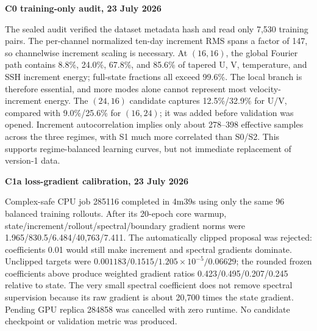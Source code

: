 \documentclass[11pt]{article}
\newenvironment{examplebox}[1]
  {\begin{center}\begin{lrbox}{\examplestore}\begin{minipage}{0.92\textwidth}%
   \textbf{#1}\par\smallskip}
  {\end{minipage}\end{lrbox}\setlength{\fboxsep}{8pt}%
   \fcolorbox{blue}{lightblue}{\usebox{\examplestore}}\end{center}}
\begin{document}
\begin{examplebox}{C0 training-only audit, 23 July 2026}
The sealed audit verified the dataset metadata hash and read only 7,530 training pairs.
The per-channel normalized ten-day increment RMS spans a factor of 147, so channelwise
increment scaling is necessary.  At \((16,16)\), the global Fourier path contains
8.8\%, 24.0\%, 67.8\%, and 85.6\% of tapered U, V, temperature, and SSH increment
energy; full-state fractions all exceed 99.6\%.  The local branch is therefore essential,
and more modes alone cannot represent most velocity-increment energy.  The
\((24,16)\) candidate captures 12.5\%/32.9\% for U/V, compared with
9.0\%/25.6\% for \((16,24)\); it was added before validation was opened.  Increment
autocorrelation implies only about 278--398 effective samples across the three regimes,
with S1 much more correlated than S0/S2.  This supports regime-balanced learning curves,
but not immediate replacement of version-1 data.
\end{examplebox}

\begin{examplebox}{C1a loss-gradient calibration, 23 July 2026}
Complex-safe CPU job 285116 completed in 4m39s using only the same 96 balanced training
rollouts.  After its 20-epoch core warmup, state/increment/rollout/spectral/boundary
gradient norms were 1.965/830.5/6.484/40,763/7.411.  The automatically clipped proposal
was rejected: coefficients 0.01 would still make increment and spectral gradients
dominate.  Unclipped targets were
\(0.001183/0.1515/1.205\times10^{-5}/0.06629\); the rounded frozen coefficients above
produce weighted gradient ratios 0.423/0.495/0.207/0.245 relative to state.  The very
small spectral coefficient does not remove spectral supervision because its raw
gradient is about 20,700 times the state gradient.  Pending GPU replica 284858 was
cancelled with zero runtime.  No candidate checkpoint or validation metric was produced.
\end{examplebox}
\end{document}
